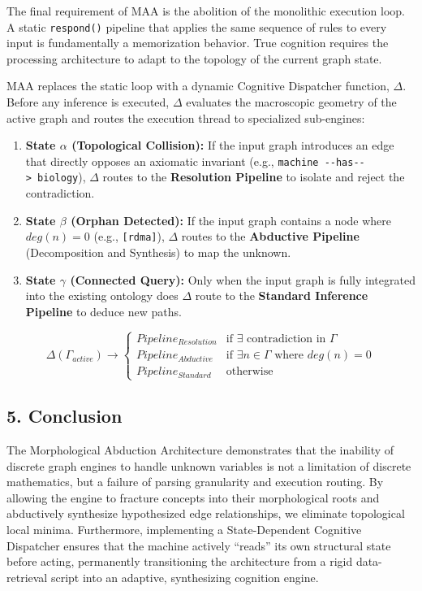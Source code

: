 \documentclass[
  11pt,
  a4paper,
]{article}
\providecommand{\tightlist}{%
  \setlength{\itemsep}{0pt}\setlength{\parskip}{0pt}}
\begin{document}
The final requirement of MAA is the abolition of the monolithic
execution loop. A static \texttt{respond()} pipeline that applies the
same sequence of rules to every input is fundamentally a memorization
behavior. True cognition requires the processing architecture to adapt
to the topology of the current graph state.

MAA replaces the static loop with a dynamic Cognitive Dispatcher
function, \(\Delta\). Before any inference is executed, \(\Delta\)
evaluates the macroscopic geometry of the active graph and routes the
execution thread to specialized sub-engines:

\begin{enumerate}
\def\labelenumi{\arabic{enumi}.}
\tightlist
\item
  \textbf{State \(\alpha\) (Topological Collision):} If the input graph
  introduces an edge that directly opposes an axiomatic invariant (e.g.,
  \texttt{machine\ -\/-has-\/-\textgreater{}\ biology}), \(\Delta\)
  routes to the \textbf{Resolution Pipeline} to isolate and reject the
  contradiction.
\item
  \textbf{State \(\beta\) (Orphan Detected):} If the input graph
  contains a node where \(deg(n) = 0\) (e.g., \texttt{{[}rdma{]}}),
  \(\Delta\) routes to the \textbf{Abductive Pipeline} (Decomposition
  and Synthesis) to map the unknown.
\item
  \textbf{State \(\gamma\) (Connected Query):} Only when the input graph
  is fully integrated into the existing ontology does \(\Delta\) route
  to the \textbf{Standard Inference Pipeline} to deduce new paths.
\end{enumerate}

\[
\Delta(\Gamma_{active}) \rightarrow
\begin{cases}
Pipeline_{Resolution} & \text{if } \exists \text{ contradiction in } \Gamma \\
Pipeline_{Abductive}  & \text{if } \exists n \in \Gamma \text{ where } deg(n) = 0 \\
Pipeline_{Standard}   & \text{otherwise}
\end{cases}
\]

\subsection{5. Conclusion}\label{conclusion}

The Morphological Abduction Architecture demonstrates that the inability
of discrete graph engines to handle unknown variables is not a
limitation of discrete mathematics, but a failure of parsing granularity
and execution routing. By allowing the engine to fracture concepts into
their morphological roots and abductively synthesize hypothesized edge
relationships, we eliminate topological local minima. Furthermore,
implementing a State-Dependent Cognitive Dispatcher ensures that the
machine actively ``reads'' its own structural state before acting,
permanently transitioning the architecture from a rigid data-retrieval
script into an adaptive, synthesizing cognition engine.
\end{document}
